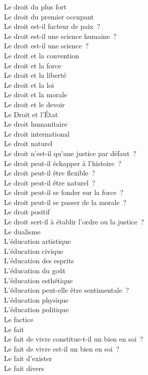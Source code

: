 \documentclass[a4paper,12pt]{article}
\begin{document}
Le droit du plus fort \\
Le droit du premier occupant \\
Le droit est-il facteur de paix ? \\
Le droit est-il une science humaine ? \\
Le droit est-il une science ? \\
Le droit et la convention \\
Le droit et la force \\
Le droit et la liberté \\
Le droit et la loi \\
Le droit et la morale \\
Le droit et le devoir \\
Le Droit et l'État \\
Le droit humanitaire \\
Le droit international \\
Le droit naturel \\
Le droit n'est-il qu'une justice par défaut ? \\
Le droit peut-il échapper à l'histoire ? \\
Le droit peut-il être flexible ? \\
Le droit peut-il être naturel ? \\
Le droit peut-il se fonder sur la force ? \\
Le droit peut-il se passer de la morale ? \\
Le droit positif \\
Le droit sert-il à établir l'ordre ou la justice ? \\
Le dualisme \\
L'éducation artistique \\
L'éducation civique \\
L'éducation des esprits \\
L'éducation du goût \\
L'éducation esthétique \\
L'éducation peut-elle être sentimentale ? \\
L'éducation physique \\
L'éducation politique \\
Le factice \\
Le fait \\
Le fait de vivre constitue-t-il un bien en soi ? \\
Le fait de vivre est-il un bien en soi ? \\
Le fait d'exister \\
Le fait divers \\
\end{document}
